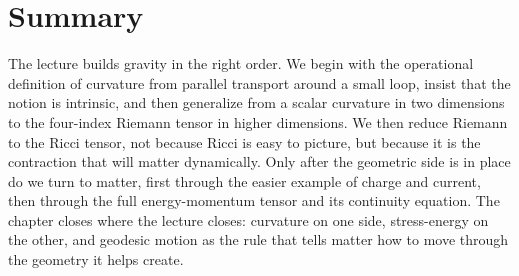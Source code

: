 \section{Summary}

The lecture builds gravity in the right order. We begin with the operational definition of curvature from parallel transport around a small loop, insist that the notion is intrinsic, and then generalize from a scalar curvature in two dimensions to the four-index Riemann tensor in higher dimensions. We then reduce Riemann to the Ricci tensor, not because Ricci is easy to picture, but because it is the contraction that will matter dynamically. Only after the geometric side is in place do we turn to matter, first through the easier example of charge and current, then through the full energy-momentum tensor and its continuity equation. The chapter closes where the lecture closes: curvature on one side, stress-energy on the other, and geodesic motion as the rule that tells matter how to move through the geometry it helps create.